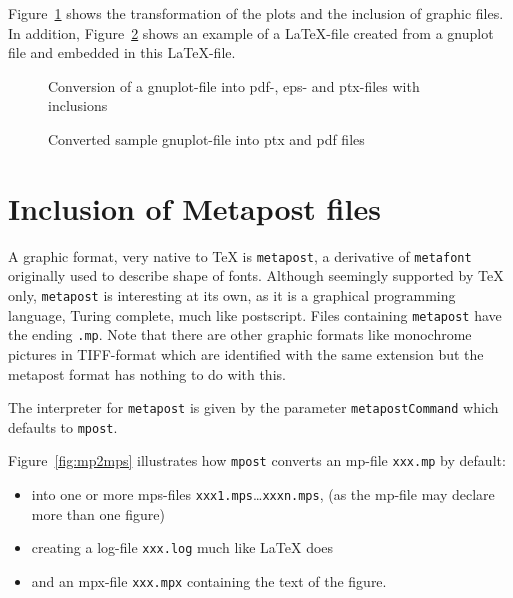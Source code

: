 \documentclass[12pt]{book}
\newcommand{\gls}[1]{#1}
\begin{document}
Figure~\ref{fig:gp2pdf} shows the transformation of the plots 
and the inclusion of graphic files. 
In addition, Figure~\ref{fig:gnuplot} shows an example of a \LaTeX-file 
created from a gnuplot file 
and embedded in this \LaTeX-file. 

\begin{figure}[htb]
\centering
{}
\caption{\label{fig:gp2pdf}Conversion of a gnuplot-file 
into pdf-, eps- and ptx-files with inclusions}
\end{figure}

\begin{figure}[htb]
\centering
{}
\caption{\label{fig:gnuplot}
Converted sample gnuplot-file into ptx and pdf files }
\end{figure}


\section{Inclusion of Metapost files}\label{sec:metapost}

A graphic format, very native to TeX is \texttt{metapost}, 
a derivative of \texttt{metafont} originally used to describe shape of fonts. 
Although seemingly supported by \TeX{} only, 
\texttt{metapost} is interesting at its own, 
as it is a graphical programming language, 
Turing complete, much like postscript. 
Files containing \texttt{metapost} have the ending \texttt{.mp}. 
Note that there are other graphic formats 
like monochrome pictures in TIFF-format 
which are identified with the same extension 
but the metapost format has nothing to do with this. 

The interpreter for \texttt{metapost} 
is given by the parameter \texttt{metapostCommand} 
which defaults to \texttt{mpost}. 


Figure~\ref{fig:mp2mps} illustrates 
how \texttt{mpost} converts an \gls{mp}-file \texttt{xxx.mp} by default: 
%
\begin{itemize}
\item
into one or more \gls{mps}-files \texttt{xxx1.mps}\dots \texttt{xxxn.mps}, 
(as the mp-file may declare more than one figure) 
\item
creating a log-file \texttt{xxx.log} much like \LaTeX{} does 
\item
and an \gls{mpx}-file \texttt{xxx.mpx} containing the text of the figure. 
\end{itemize}
\end{document}
